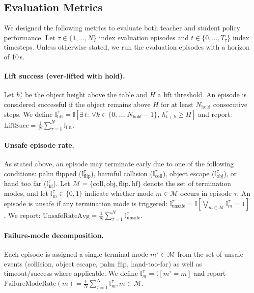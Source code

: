 \subsection{Evaluation Metrics}
We designed the following metrics to evaluate both teacher and student policy performance.
Let $\tau\in\{1,\dots,N\}$ index evaluation episodes and $t\in\{0,\dots,T_\tau\}$ index timesteps.
Unless otherwise stated, we run the evaluation episodes with a horizon of 10\,s.

\paragraph{Lift success (ever-lifted with hold).}
Let $h_t^\tau$ be the object height above the table and $H$ a lift threshold. An episode is considered
successful if the object remains above $H$ for at least $N_{\mathrm{hold}}$ consecutive steps. We define
$\mathbb{I}^{\tau}_{\mathrm{lift}}
=\mathbb{I}\!\left[\exists\, t:\ \forall k\in\{0,\dots,N_{\mathrm{hold}}-1\},\ h_{t+k}^{\tau}\ge H\right]$
and report:
$\mathrm{LiftSucc}=\frac{1}{N}\sum_{\tau=1}^{N} \mathbb{I}^{\tau}_{\mathrm{lift}}.$

\paragraph{Unsafe episode rate.}
As stated above, an episode may terminate early due to one of the following conditions:
palm flipped ($\mathbb{I}_{\mathrm{flip}}^{\tau}$), harmful collision ($\mathbb{I}_{\mathrm{coll}}^{\tau}$),
object escape ($\mathbb{I}_{\mathrm{obj}}^{\tau}$), or hand too far ($\mathbb{I}_{\mathrm{hf}}^{\tau}$).
Let $\mathcal{M}=\{\mathrm{coll},\mathrm{obj},\mathrm{flip},\mathrm{hf}\}$ denote the set of termination modes,
and let $\mathbb{I}_m^\tau\in\{0,1\}$ indicate whether mode $m\in\mathcal{M}$ occurs in episode $\tau$.
An episode is unsafe if any termination mode is triggered:
$\mathbb{I}^{\tau}_{\mathrm{unsafe}}
=\mathbb{I}\!\left[\bigvee_{m\in\mathcal{M}} \mathbb{I}^{\tau}_{m}=1\right]$. We report:
$\mathrm{UnsafeRateAvg}=\frac{1}{N}\sum_{\tau=1}^{N} \mathbb{I}^{\tau}_{\mathrm{unsafe}}.$

\paragraph{Failure-mode decomposition.}
Each episode is assigned a single terminal mode $m^\tau\in\mathcal{M}$ from the
set of unsafe events (collision, object escape, palm flip, hand-too-far) as well
as timeout/success where applicable. We define
$\mathbb{I}^{\tau}_{m}=\mathbb{I}[m^\tau=m]$ and report
$\mathrm{FailureModeRate}(m)=\frac{1}{N}\sum_{\tau=1}^{N}\mathbb{I}^{\tau}_{m}, m\in\mathcal{M}.$

